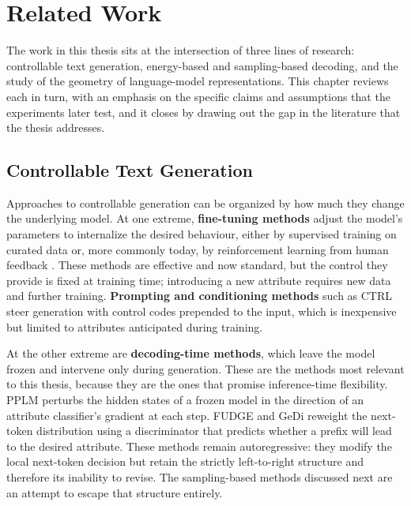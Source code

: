 \chapter{Related Work}
\label{ch:related}

The work in this thesis sits at the intersection of three lines of research: controllable text generation, energy-based and sampling-based decoding, and the study of the geometry of language-model representations. This chapter reviews each in turn, with an emphasis on the specific claims and assumptions that the experiments later test, and it closes by drawing out the gap in the literature that the thesis addresses.

\section{Controllable Text Generation}
\label{sec:rel-ctg}

Approaches to controllable generation can be organized by how much they change the underlying model. At one extreme, \textbf{fine-tuning methods} adjust the model's parameters to internalize the desired behaviour, either by supervised training on curated data or, more commonly today, by reinforcement learning from human feedback \citep{ouyang2022training}. These methods are effective and now standard, but the control they provide is fixed at training time; introducing a new attribute requires new data and further training. \textbf{Prompting and conditioning methods} such as CTRL \citep{keskar2019ctrl} steer generation with control codes prepended to the input, which is inexpensive but limited to attributes anticipated during training.

At the other extreme are \textbf{decoding-time methods}, which leave the model frozen and intervene only during generation. These are the methods most relevant to this thesis, because they are the ones that promise inference-time flexibility. PPLM \citep{dathathri2020plug} perturbs the hidden states of a frozen model in the direction of an attribute classifier's gradient at each step. FUDGE \citep{yang2021fudge} and GeDi \citep{krause2021gedi} reweight the next-token distribution using a discriminator that predicts whether a prefix will lead to the desired attribute. These methods remain autoregressive: they modify the local next-token decision but retain the strictly left-to-right structure and therefore its inability to revise. The sampling-based methods discussed next are an attempt to escape that structure entirely.


